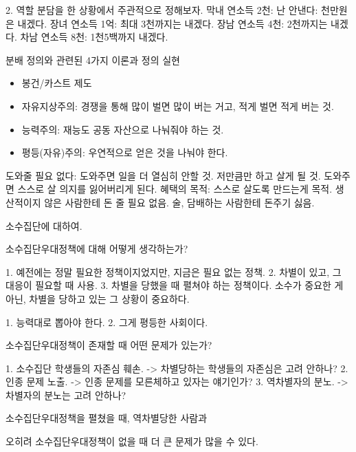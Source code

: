 2. 역할 분담을 한 상황에서 주관적으로 정해보자.
막내 연소득 2천: 난 안낸다: 천만원은 내겠다.
장녀 연소득 1억: 최대 3천까지는 내겠다.
장남 연소득 4천: 2천까지는 내겠다.
차남 연소득 8천: 1천5백까지 내겠다.

분배 정의와 관련된 4가지 이론과 정의 실현
\begin{itemize}
  \item 봉건/카스트 제도
  \item 자유지상주의: 경쟁을 통해 많이 벌면 많이 버는 거고, 적게 벌면 적게 버는 것.
  \item 능력주의: 재능도 공동 자산으로 나눠줘야 하는 것.
  \item 평등(자유)주의: 우연적으로 얻은 것을 나눠야 한다.
\end{itemize}

도와줄 필요 없다: 
  도와주면 일을 더 열심히 안할 것. 저만큼만 하고 살게 될 것.
  도와주면 스스로 살 의지를 잃어버리게 된다.
  혜택의 목적: 스스로 살도록 만드는게 목적. 생산적이지 않은 사람한테 돈 줄 필요 없음.
  술, 담배하는 사람한테 돈주기 싫음. 

소수집단에 대하여.

소수집단우대정책에 대해 어떻게 생각하는가?

1. 예전에는 정말 필요한 정책이지었지만, 지금은 필요 없는 정책.
2. 차별이 있고, 그 대응이 필요할 때 사용.
3. 차별을 당했을 때 펼쳐야 하는 정책이다. 소수가 중요한 게 아닌, 차별을 당하고 있는 그 상황이 중요하다.

1. 능력대로 뽑아야 한다.
2. 그게 평등한 사회이다.

소수집단우대정책이 존재할 때 어떤 문제가 있는가?

1. 소수집단 학생들의 자존심 훼손.
      -> 차별당하는 학생들의 자존심은 고려 안하나?
2. 인종 문제 노출.
      -> 인종 문제를 모른체하고 있자는 얘기인가?
3. 역차별자의 분노.
      -> 차별자의 분노는 고려 안하나?

소수집단우대정책을 펼쳤을 때, 역차별당한 사람과 

오히려 소수집단우대정책이 없을 때 더 큰 문제가 많을 수 있다.